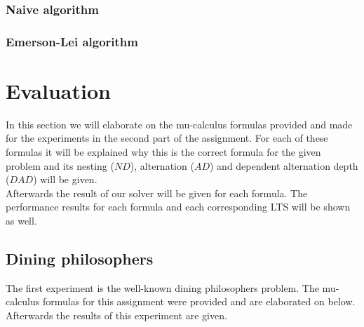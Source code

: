 \documentclass[10pt,a4paper]{article}
\begin{document}
\subsubsection{Naive algorithm}


\subsubsection{Emerson-Lei algorithm}



\section{Evaluation}\label{eval}
In this section we will elaborate on the mu-calculus formulas provided and made for the experiments in the second part of the assignment. For each of these formulas it will be explained why this is the correct formula for the given problem and its nesting ($ND$), alternation ($AD$) and dependent alternation depth ($DAD$) will be given.\\
Afterwards the result of our solver will be given for each formula. The performance results for each formula and each corresponding LTS will be shown as well.

\subsection{Dining philosophers}
The first experiment is the well-known dining philosophers problem. The mu-calculus formulas for this assignment were provided and are elaborated on below. Afterwards the results of this experiment are given.
\end{document}
